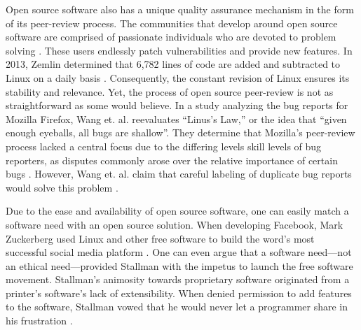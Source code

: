 Open source software also has a unique quality assurance mechanism in the form
of its peer-review process. The communities that develop around open source
software are comprised of passionate individuals who are devoted to problem
solving \cite[p. 19]{bisson}. These users endlessly patch vulnerabilities and
provide new features. In 2013, Zemlin determined  that 6,782 lines of code are
added and subtracted to Linux on a daily basis \cite[12:03]{zemlin}.
Consequently, the  constant revision of Linux ensures its stability and
relevance. Yet, the process of open source peer-review is not as straightforward
as some would believe. In a study analyzing the bug reports for Mozilla Firefox,
Wang et. al. reevaluates “Linus's Law,” or the idea that “given enough eyeballs,
all bugs are shallow”\cite[p. 52]{wang}.  They determine that Mozilla's
peer-review process lacked a central focus due to the differing levels skill
levels of bug reporters, as disputes commonly arose over the relative importance
of certain bugs \citeyear[p. 52]{wang}. However, Wang et. al.  claim that
careful labeling of duplicate bug reports would solve this problem \citeyear[p.
52]{wang}.

Due to the ease and availability of open source software, one can easily match
a software need with an open source solution. When developing Facebook,
Mark Zuckerberg used Linux and other free software to build the word's most
successful social media platform \cite[6:18]{zemlin}. One can even argue that
a software need—not an ethical need—provided Stallman with the impetus to launch
the free software movement. Stallman's animosity towards proprietary software
originated from a printer's software's lack of extensibility. When denied
permission to add features to the software, Stallman vowed that he
would never let a programmer share in his frustration \citeyear[para.
19]{rms2015}.
